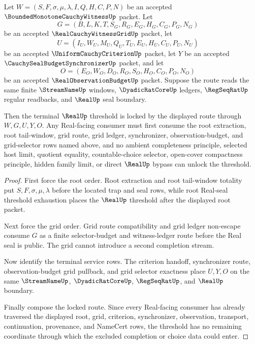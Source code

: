 \begin{theorem}
\label{thm:bounded-monotone-cauchy-witness-realup-threshold-lock}
Let $W=(S,F,\sigma,\mu,\lambda,I,Q,H,C,P,N)$ be an accepted $\BoundedMonotoneCauchyWitnessUp$ packet. Let
$$
G=(B,L,K,T,S_G,R_G,E_G,H_G,C_G,P_G,N_G)
$$
be an accepted $\RealCauchyWitnessGridUp$ packet, let
$$
U=(I_U,W_U,M_U,Q_U,T_U,E_U,H_U,C_U,P_U,N_U)
$$
be an accepted $\UniformCauchyCriterionUp$ packet, let $Y$ be an accepted $\CauchySealBudgetSynchronizerUp$ packet, and let
$$
O=(E_O,W_O,D_O,R_O,S_O,H_O,C_O,P_O,N_O)
$$
be an accepted $\RealObservationBudgetUp$ packet. Suppose the route reads the same finite $\StreamNameUp$ windows, $\DyadicRatCoreUp$ ledgers, $\RegSeqRatUp$ regular readbacks, and $\RealUp$ seal boundary.

Then the terminal $\RealUp$ threshold is locked by the displayed route through $W,G,U,Y,O$. Any Real-facing consumer must first consume the root extraction, root tail-window, grid route, grid ledger, synchronizer, observation-budget, and grid-selector rows named above, and no ambient completeness principle, selected host limit, quotient equality, countable-choice selector, open-cover compactness principle, hidden family limit, or direct $\RealUp$ bypass can unlock the threshold.
\end{theorem}
\begin{proof}
First force the root order. Root extraction and root tail-window totality put $S,F,\sigma,\mu,\lambda$ before the located trap and seal rows, while root Real-seal threshold exhaustion places the $\RealUp$ threshold after the displayed root packet.

Next force the grid order. Grid route compatibility and grid ledger non-escape consume $G$ as a finite selector-budget and witness-ledger route before the Real seal is public. The grid cannot introduce a second completion stream.

Now identify the terminal service rows. The criterion handoff, synchronizer route, observation-budget grid pullback, and grid selector exactness place $U,Y,O$ on the same $\StreamNameUp$, $\DyadicRatCoreUp$, $\RegSeqRatUp$, and $\RealUp$ boundary.

Finally compose the locked route. Since every Real-facing consumer has already traversed the displayed root, grid, criterion, synchronizer, observation, transport, continuation, provenance, and NameCert rows, the threshold has no remaining coordinate through which the excluded completion or choice data could enter.
\end{proof}
